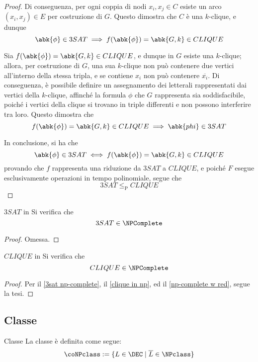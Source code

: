 \documentclass[a4paper, 12pt]{report}
\begin{document}
\begin{proof}
        Di conseguenza, per ogni coppia di nodi $x_i, x_j \in C$ esiste un arco $(x_i, x_j) \in E$ per costruzione di $G$. Questo dimostra che $C$ è una $k$-clique, e dunque $$\abk{\phi} \in 3SAT \implies f(\abk{\phi}) = \abk{G, k} \in CLIQUE$$

        Sia $f(\abk{\phi}) = \abk{G, k} \in CLIQUE$, e dunque in $G$ esiste una $k$-clique; allora, per costruzione di $G$, una sua $k$-clique non può contenere due vertici all'interno della stessa tripla, e se contiene $x_i$ non può contenere $\overline {x_i}$. Di conseguenza, è possibile definire un assegnamento dei letterali rappresentati dai vertici della $k$-clique, affinché la formula $\phi$ che $G$ rappresenta sia soddisfacibile, poiché i vertici della clique si trovano in triple differenti e non possono interferire tra loro. Questo dimostra che $$f(\abk{\phi}) = \abk{G, k} \in CLIQUE \implies \abk{phi} \in 3SAT$$

        In conclusione, si ha che $$\abk{\phi} \in 3SAT \iff f(\abk{\phi}) = \abk{G, k} \in CLIQUE$$ provando che $f$ rappresenta una riduzione da $3SAT$ a $CLIQUE$, e poiché $F$ esegue esclusivamente operazioni in tempo polinomiale, segue che $$3SAT \leq_\mathrm P CLIQUE$$
    \end{proof}

    \begin{framedthm}[label={3sat np-complete}]{$3SAT$ in \NPComplete}
        Si verifica che $$3SAT \in \NPComplete$$
    \end{framedthm}

    \begin{proof}
        Omessa.
    \end{proof}

    \begin{framedcor}{$CLIQUE$ in \NPComplete}
        Si verifica che $$CLIQUE \in \NPComplete$$
    \end{framedcor}

    \begin{proof}
        Per il \cref{3sat np-complete}, il \cref{clique in np}, ed il \cref{np-complete w red}, segue la tesi.
    \end{proof}
    
    \subsection{Classe \coNPclass}

    \begin{frameddefn}{Classe \coNPclass}
        La classe \coNPclass è definita come segue: $$\coNPclass := \{L \in \DEC \mid \overline L \in \NPclass\}$$
    \end{frameddefn}
\end{document}
